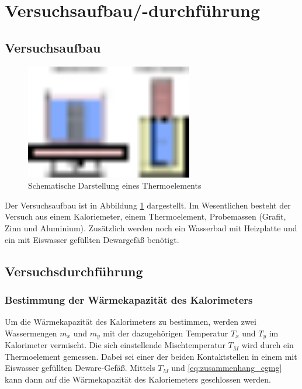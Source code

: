 \section{Versuchsaufbau/-durchführung}

\subsection{Versuchsaufbau}
\begin{figure}
  \centering
  \includegraphics[width=0.65\textwidth]{bilder/versuchsaufbau_dulon_peptip.pdf}
  \caption{Schematische Darstellung eines Thermoelements}
  \label{fig:aufbau}
\end{figure}
Der Versuchsaufbau ist in Abbildung \ref{fig:aufbau} dargestellt.
Im Wesentlichen besteht der Versuch aus einem Kaloriemeter, einem Thermoelement,
Probemassen (Grafit, Zinn und Aluminium).
Zusätzlich werden noch ein Wasserbad mit Heizplatte und
ein mit Eiswasser gefüllten Dewargefäß benötigt.

\subsection{Versuchsdurchführung}

\subsubsection{Bestimmung der Wärmekapazität des Kalorimeters}
Um die Wärmekapazität des Kalorimeters zu bestimmen, werden 
zwei Wassermengen $m_x$ und $m_y$ mit der dazugehörigen Temperatur $T_x$ und $T_y$ 
im Kalorimeter vermischt. 
Die sich einstellende Mischtemperatur $T_M$ wird durch ein Thermoelement gemessen.
Dabei sei einer der beiden Kontaktstellen
in einem mit Eiswasser gefüllten Deware-Gefäß.
Mittels $T_M$ und \eqref{eq:zusammenhang_cgmg} kann dann auf die Wärmekapazität des 
Kaloriemeters geschlossen werden.

